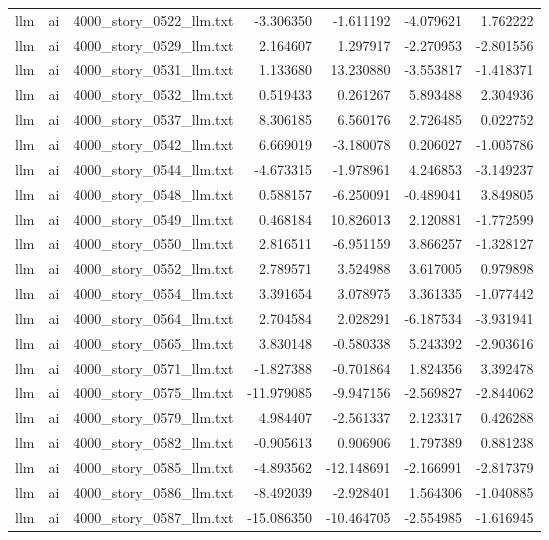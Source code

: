 \begin{longtable}{lllrrrr}
llm & ai & 4000\_story\_0522\_llm.txt & -3.306350 & -1.611192 & -4.079621 & 1.762222 \\
llm & ai & 4000\_story\_0529\_llm.txt & 2.164607 & 1.297917 & -2.270953 & -2.801556 \\
llm & ai & 4000\_story\_0531\_llm.txt & 1.133680 & 13.230880 & -3.553817 & -1.418371 \\
llm & ai & 4000\_story\_0532\_llm.txt & 0.519433 & 0.261267 & 5.893488 & 2.304936 \\
llm & ai & 4000\_story\_0537\_llm.txt & 8.306185 & 6.560176 & 2.726485 & 0.022752 \\
llm & ai & 4000\_story\_0542\_llm.txt & 6.669019 & -3.180078 & 0.206027 & -1.005786 \\
llm & ai & 4000\_story\_0544\_llm.txt & -4.673315 & -1.978961 & 4.246853 & -3.149237 \\
llm & ai & 4000\_story\_0548\_llm.txt & 0.588157 & -6.250091 & -0.489041 & 3.849805 \\
llm & ai & 4000\_story\_0549\_llm.txt & 0.468184 & 10.826013 & 2.120881 & -1.772599 \\
llm & ai & 4000\_story\_0550\_llm.txt & 2.816511 & -6.951159 & 3.866257 & -1.328127 \\
llm & ai & 4000\_story\_0552\_llm.txt & 2.789571 & 3.524988 & 3.617005 & 0.979898 \\
llm & ai & 4000\_story\_0554\_llm.txt & 3.391654 & 3.078975 & 3.361335 & -1.077442 \\
llm & ai & 4000\_story\_0564\_llm.txt & 2.704584 & 2.028291 & -6.187534 & -3.931941 \\
llm & ai & 4000\_story\_0565\_llm.txt & 3.830148 & -0.580338 & 5.243392 & -2.903616 \\
llm & ai & 4000\_story\_0571\_llm.txt & -1.827388 & -0.701864 & 1.824356 & 3.392478 \\
llm & ai & 4000\_story\_0575\_llm.txt & -11.979085 & -9.947156 & -2.569827 & -2.844062 \\
llm & ai & 4000\_story\_0579\_llm.txt & 4.984407 & -2.561337 & 2.123317 & 0.426288 \\
llm & ai & 4000\_story\_0582\_llm.txt & -0.905613 & 0.906906 & 1.797389 & 0.881238 \\
llm & ai & 4000\_story\_0585\_llm.txt & -4.893562 & -12.148691 & -2.166991 & -2.817379 \\
llm & ai & 4000\_story\_0586\_llm.txt & -8.492039 & -2.928401 & 1.564306 & -1.040885 \\
llm & ai & 4000\_story\_0587\_llm.txt & -15.086350 & -10.464705 & -2.554985 & -1.616945 \\

\end{longtable}
